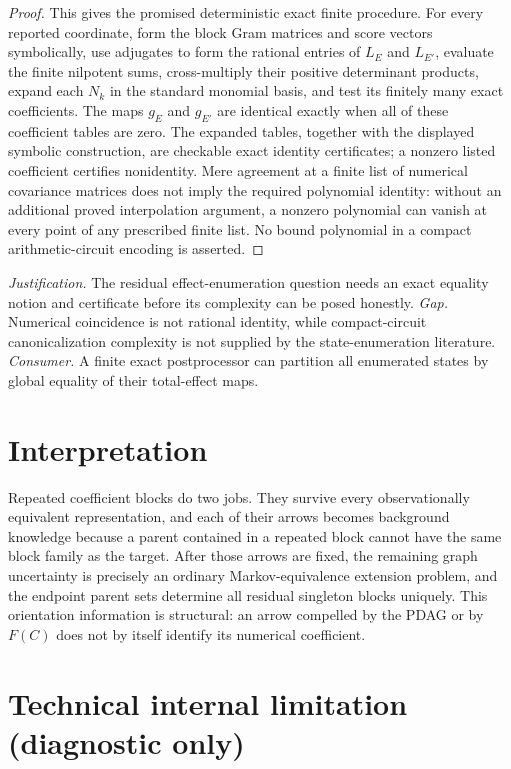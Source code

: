 \documentclass{article}
\begin{document}
\begin{proof}
This gives the promised deterministic exact finite procedure.  For every reported coordinate, form the block Gram matrices and score vectors symbolically, use adjugates to form the rational entries of \(L_E\) and \(L_{E'}\), evaluate the finite nilpotent sums, cross-multiply their positive determinant products, expand each \(N_k\) in the standard monomial basis, and test its finitely many exact coefficients.  The maps \(g_E\) and \(g_{E'}\) are identical exactly when all of these coefficient tables are zero.  The expanded tables, together with the displayed symbolic construction, are checkable exact identity certificates; a nonzero listed coefficient certifies nonidentity.  Mere agreement at a finite list of numerical covariance matrices does not imply the required polynomial identity: without an additional proved interpolation argument, a nonzero polynomial can vanish at every point of any prescribed finite list.  No bound polynomial in a compact arithmetic-circuit encoding is asserted.
\end{proof}
\par\smallskip\noindent \textit{Justification.} The residual effect-enumeration question needs an exact equality notion and certificate before its complexity can be posed honestly. \textit{Gap.} Numerical coincidence is not rational identity, while compact-circuit canonicalization complexity is not supplied by the state-enumeration literature. \textit{Consumer.} A finite exact postprocessor can partition all enumerated states by global equality of their total-effect maps.

\section{Interpretation}

Repeated coefficient blocks do two jobs. They survive every observationally equivalent representation, and each of their arrows becomes background knowledge because a parent contained in a repeated block cannot have the same block family as the target. After those arrows are fixed, the remaining graph uncertainty is precisely an ordinary Markov-equivalence extension problem, and the endpoint parent sets determine all residual singleton blocks uniquely. This orientation information is structural: an arrow compelled by the PDAG or by \(F(C)\) does not by itself identify its numerical coefficient.

\section*{Technical internal limitation (diagnostic only)}
\end{document}

